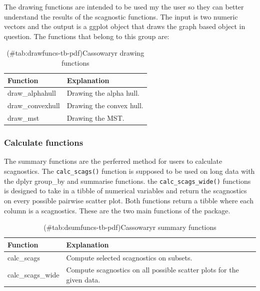The drawing functions are intended to be used my the user so they can
better understand the results of the scagnostic functions. The input is
two numeric vectors and the output is a ggplot object that draws the
graph based object in question. The functions that belong to this group
are:

\begin{Schunk}
\begin{table}

\caption{(\#tab:drawfuncs-tb-pdf)Cassowaryr drawing functions}
\centering
\begin{tabular}[t]{>{\raggedright\arraybackslash}p{3cm}l}
\toprule
Function & Explanation\\
\midrule
draw\_alphahull & Drawing the alpha hull.\\
draw\_convexhull & Drawing the convex hull.\\
draw\_mst & Drawing the MST.\\
\bottomrule
\end{tabular}
\end{table}

\end{Schunk}

\hypertarget{calculate-functions}{%
\subsubsection{Calculate functions}\label{calculate-functions}}

The summary functions are the perferred method for users to calculate
scagnostics. The \texttt{calc\_scags()} function is supposed to be used
on long data with the dplyr group\_by and summarise functions. the
\texttt{calc\_scags\_wide()} functions is designed to take in a tibble
of numerical variables and return the scagnostics on every possible
pairwise scatter plot. Both functions return a tibble where each column
is a scagnostics. These are the two main functions of the package.

\begin{Schunk}
\begin{table}

\caption{(\#tab:dsumfuncs-tb-pdf)Cassowaryr summary functions}
\centering
\begin{tabular}[t]{>{\raggedright\arraybackslash}p{3cm}l}
\toprule
Function & Explanation\\
\midrule
calc\_scags & Compute selected scagnostics on subsets.\\
calc\_scags\_wide & Compute scagnostics on all possible scatter plots for the given data.\\
\bottomrule
\end{tabular}
\end{table}

\end{Schunk}


